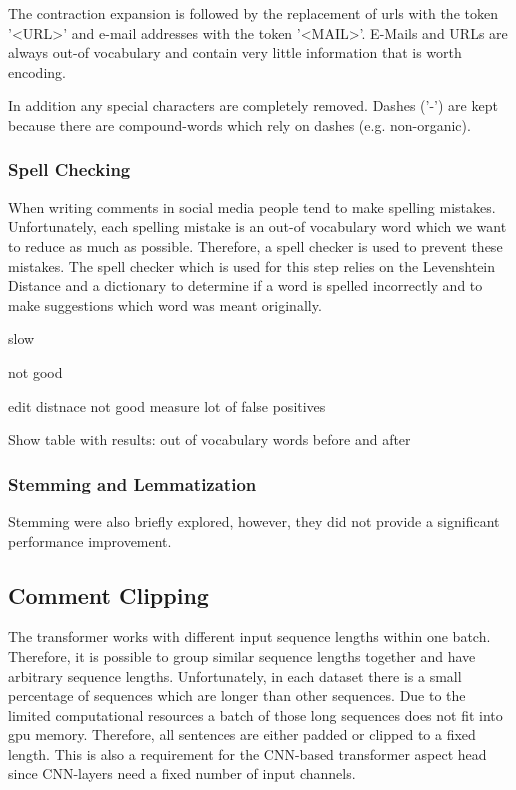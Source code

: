 
The contraction expansion is followed by the replacement of \glspl{url} with the token '<URL>' and e-mail addresses with the token '<MAIL>'. E-Mails and URLs are always out-of vocabulary and contain very little information that is worth encoding. 


In addition any special characters are completely removed. Dashes ('-') are kept because there are compound-words which rely on dashes (e.g. non-organic).

\subsubsection*{Spell Checking}
When writing comments in social media people tend to make spelling mistakes. Unfortunately, each spelling mistake is an out-of vocabulary word which we want to reduce as much as possible.
Therefore, a spell checker is used to prevent these mistakes. The spell checker which is used for this step relies on the Levenshtein Distance \cite{Levenshtein1966} and a dictionary to determine if a word is spelled incorrectly and to make suggestions which word was meant originally. 

slow

not good

edit distnace not good measure
lot of false positives


Show table with results: out of vocabulary words before and after

\subsubsection*{Stemming and Lemmatization}

Stemming were also briefly explored, however, they did not provide a significant performance improvement.

\subsection{Comment Clipping}


The transformer works with different input sequence lengths within one batch. Therefore, it is possible to group similar sequence lengths together and have arbitrary sequence lengths. Unfortunately, in each dataset there is a small percentage of sequences which are longer than other sequences. Due to the limited computational resources a batch of those long sequences  does not fit into \gls{gpu} memory. Therefore, all sentences are either padded or clipped to a fixed length. This is also a requirement for the CNN-based transformer aspect head since CNN-layers need a fixed number of input channels.

